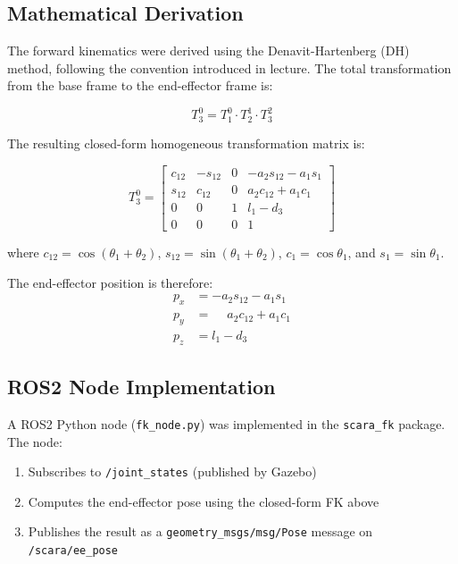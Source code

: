 \documentclass[12pt]{article}
\begin{document}
\subsection{Mathematical Derivation}

The forward kinematics were derived using the Denavit-Hartenberg (DH) method,
following the convention introduced in lecture. The total transformation from
the base frame to the end-effector frame is:

\[
T_3^0 = T_1^0 \cdot T_2^1 \cdot T_3^2
\]

The resulting closed-form homogeneous transformation matrix is:

\[
T_3^0 =
\begin{bmatrix}
c_{12} & -s_{12} & 0 & -a_2 s_{12} - a_1 s_1 \\
s_{12} &  c_{12} & 0 &  a_2 c_{12} + a_1 c_1 \\
0      &  0      & 1 &  l_1 - d_3 \\
0      &  0      & 0 &  1
\end{bmatrix}
\]

where $c_{12} = \cos(\theta_1 + \theta_2)$, $s_{12} = \sin(\theta_1 + \theta_2)$,
$c_1 = \cos\theta_1$, and $s_1 = \sin\theta_1$.

The end-effector position is therefore:
\begin{align}
p_x &= -a_2 s_{12} - a_1 s_1 \\
p_y &= \phantom{-}a_2 c_{12} + a_1 c_1 \\
p_z &= l_1 - d_3
\end{align}

\subsection{ROS2 Node Implementation}

A ROS2 Python node (\texttt{fk\_node.py}) was implemented in the
\texttt{scara\_fk} package. The node:

\begin{enumerate}
    \item Subscribes to \texttt{/joint\_states} (published by Gazebo)
    \item Computes the end-effector pose using the closed-form FK above
    \item Publishes the result as a \texttt{geometry\_msgs/msg/Pose} message
          on \texttt{/scara/ee\_pose}
\end{enumerate}
\end{document}
